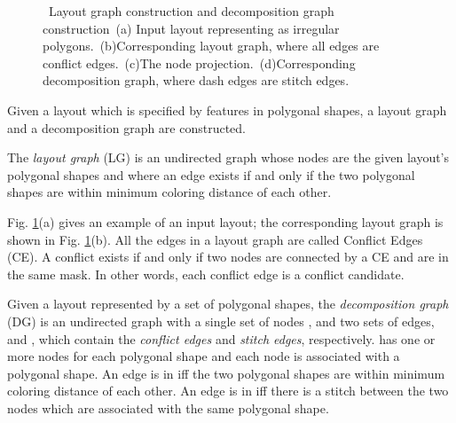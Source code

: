 \documentclass[10pt,conference]{IEEEtran}
\begin{document}
\begin{figure}[bt]
	\centering
	\hspace{.1em}
	\caption{~Layout graph construction and decomposition graph construction~(a) Input layout representing as irregular polygons.~(b)Corresponding layout graph, where all edges are conflict edges.~(c)The node projection.~(d)Corresponding decomposition graph, where dash edges are stitch edges.}
\label{fig:input}
\end{figure}


Given a layout which is specified by features in polygonal shapes, a layout graph \cite{DPL_ICCAD08_Kahng} and a decomposition graph \cite{DPL_ICCAD2010_Yuan}  are constructed.




\begin{define}
The \textit{ layout graph} (LG) is an undirected graph whose nodes are the given layout's polygonal shapes and where an edge exists if and only if the two polygonal shapes are within minimum coloring distance  of each other.
\end{define}

Fig. \ref{fig:input}(a) gives an example of an input layout; the corresponding layout graph is shown in Fig. \ref{fig:input}(b).
All the edges in a layout graph are called Conflict Edges (CE).
A conflict exists if and only if two nodes are connected by a CE and are in the same mask.
In other words, each conflict edge is a conflict candidate.



\begin{define}
Given a layout represented by a set of polygonal shapes, the \textit{decomposition graph} (DG) is an undirected graph with a single set of nodes , and two sets of edges,  and , which contain the \textit{conflict edges} and \textit{stitch edges}, respectively.
 has one or more nodes for each polygonal shape and each node is associated with a polygonal shape.
An edge is in  iff the two polygonal shapes are within minimum coloring distance  of each other.
An edge is in  iff there is a stitch between the two nodes which are associated with the same polygonal shape.
\end{define}
\end{document}
